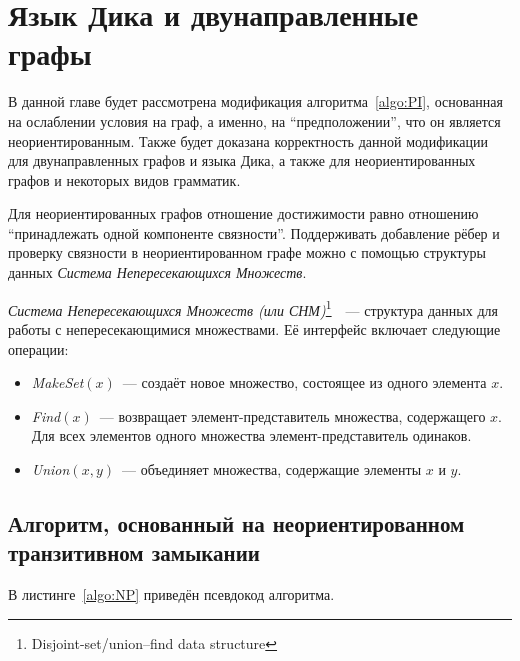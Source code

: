 \section{Язык Дика и двунаправленные графы}\label{section:bidirected}

В данной главе будет рассмотрена модификация алгоритма~\ref{algo:PI}, основанная на ослаблении условия на граф, а именно, на ``предположении'', что он является неориентированным. Также будет доказана корректность данной модификации для двунаправленных графов и языка Дика, а также для неориентированных графов и некоторых видов грамматик.

Для неориентированных графов отношение достижимости равно отношению ``принадлежать одной компоненте связности''. Поддерживать добавление рёбер и проверку связности в неориентированном графе можно с помощью структуры данных \textit{Система Непересекающихся Множеств}. 

\begin{definition}\label{def:DSU}
  \textit{Система Непересекающихся Множеств (или СНМ)}\footnote{Disjoint-set/union–find data structure}~\cite{Galler1964}~--- структура данных для работы с непересекающимися множествами. Её интерфейс включает следующие операции:
  \vspace{-\topsep}
  \begin{itemize}
    \setlength\itemsep{-0.1em}
    \item \textit{MakeSet}$(x)$~--- создаёт новое множество, состоящее из одного элемента $x$.
    \item \textit{Find}$(x)$~--- возвращает элемент-представитель множества, содержащего $x$.\\ Для всех элементов одного множества элемент-представитель одинаков.
    \item \textit{Union}$(x, y)$~--- объединяет множества, содержащие элементы $x$ и $y$.
  \end{itemize}
\end{definition}

\subsection{Алгоритм, основанный на неориентированном\\ транзитивном замыкании}\label{subsection:undirected}

В листинге~\ref{algo:NP} приведён псевдокод алгоритма.

